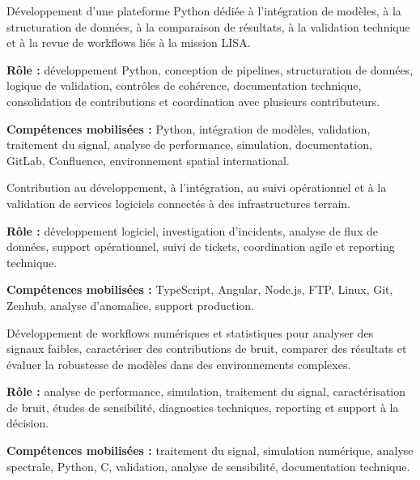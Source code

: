 \documentclass[8pt,a4paper,ragged2e,withhyper]{altacv}
\begin{document}
Développement d’une plateforme Python dédiée à l’intégration de modèles, à la structuration de données, à la comparaison de résultats, à la validation technique et à la revue de workflows liés à la mission LISA.

\textbf{Rôle :} développement Python, conception de pipelines, structuration de données, logique de validation, contrôles de cohérence, documentation technique, consolidation de contributions et coordination avec plusieurs contributeurs.

\textbf{Compétences mobilisées :} Python, intégration de modèles, validation, traitement du signal, analyse de performance, simulation, documentation, GitLab, Confluence, environnement spatial international.

\divider


Contribution au développement, à l’intégration, au suivi opérationnel et à la validation de services logiciels connectés à des infrastructures terrain.

\textbf{Rôle :} développement logiciel, investigation d’incidents, analyse de flux de données, support opérationnel, suivi de tickets, coordination agile et reporting technique.

\textbf{Compétences mobilisées :} TypeScript, Angular, Node.js, FTP, Linux, Git, Zenhub, analyse d’anomalies, support production.

\divider


Développement de workflows numériques et statistiques pour analyser des signaux faibles, caractériser des contributions de bruit, comparer des résultats et évaluer la robustesse de modèles dans des environnements complexes.

\textbf{Rôle :} analyse de performance, simulation, traitement du signal, caractérisation de bruit, études de sensibilité, diagnostics techniques, reporting et support à la décision.

\textbf{Compétences mobilisées :} traitement du signal, simulation numérique, analyse spectrale, Python, C, validation, analyse de sensibilité, documentation technique.

\end{document}
